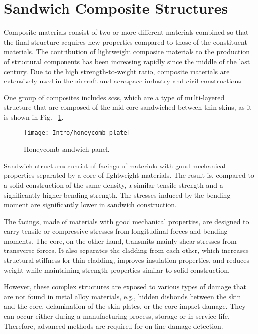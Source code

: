 \section{Sandwich Composite Structures}
\label{sec:scs}

Composite materials consist of two or more different materials combined so that the final structure acquires new properties compared to those of the constituent materials.
The contribution of lightweight composite materials to the production of structural components has been increasing rapidly since the middle of the last century.
Due to the high strength-to-weight ratio, composite materials are extensively used in the aircraft and aerospace industry and civil constructions.

One group of composites includes \acp{scs}, which are a type of multi-layered structure that are composed of the mid-core sandwiched between thin skins, as it is shown in Fig.~ \ref{fig:hcp}. 
\begin{figure}[H] %
	\begin{center}
		\texttt{[image: Intro/honeycomb\_plate]} \caption{
			\label{fig:hcp} Honeycomb sandwich panel.}
		\vspace{-0.5cm}
	\end{center}
\end{figure}
Sandwich structures consist of facings of materials with good mechanical properties separated by a core of lightweight materials. The result is, compared to a solid construction of the same density, a similar tensile strength and a significantly higher bending strength. The stresses induced by the bending moment are significantly lower in sandwich construction.

The facings, made of materials with good mechanical properties, are designed to carry tensile or compressive stresses from longitudinal forces and bending moments. The core, on the other hand, transmits mainly shear stresses from transverse forces. It also separates the cladding from each other, which increases structural stiffness for thin cladding, improves insulation properties, and reduces weight while maintaining strength properties similar to solid construction.


However, these complex structures are exposed to various types of damage that are not found in metal alloy materials, e.g., hidden disbonds between the skin and the core, delamination of the skin plates, or the core impact damage.
They can occur either during a manufacturing process, storage or in-service life.
Therefore, advanced methods are required for on-line damage detection.




